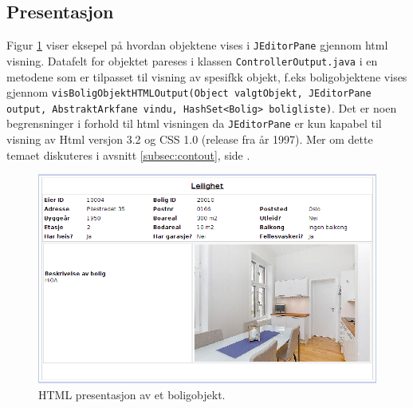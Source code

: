 \subsection{Presentasjon}
Figur \ref{fig:presentasjon} viser eksepel på hvordan objektene vises i \texttt{JEditorPane} gjennom html visning. Datafelt for objektet pareses i klassen \texttt{ControllerOutput.java} i en metodene som er tilpasset til visning av spesifkk objekt, f.eks boligobjektene vises gjennom \texttt{visBoligObjektHTMLOutput(Object valgtObjekt, JEditorPane output, AbstraktArkfane vindu, HashSet<Bolig> boligliste)}. Det er noen begrensninger i forhold til html visningen da \texttt{JEditorPane} er kun kapabel til visning av Html versjon 3.2 og CSS 1.0 (release fra år 1997). Mer om dette temaet diskuteres i avsnitt \ref{subsec:contout}, side \pageref{subsec:contout}.

\begin{figure}[ht!]
 \includegraphics[width=\textwidth,height=\textheight,keepaspectratio]{./img/produktdokumentasjon/visuelle_detaljer/presentasjon.png}
 \caption{HTML presentasjon av et boligobjekt.}
 \label{fig:presentasjon}
\end{figure}


